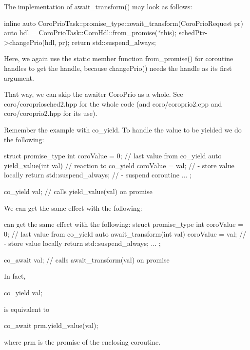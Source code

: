 The implementation of await\_transform() may look as follows:

\begin{cpp}
inline auto CoroPrioTask::promise_type::await_transform(CoroPrioRequest pr) {
	auto hdl = CoroPrioTask::CoroHdl::from_promise(*this);
	schedPtr->changePrio(hdl, pr);
	return std::suspend_always{};
}
\end{cpp}

Here, we again use the static member function from\_promise() for coroutine handles to get the handle, because changePrio() needs the handle as its first argument.

That way, we can skip the awaiter CoroPrio as a whole. See coro/coropriosched2.hpp for the whole code (and coro/coroprio2.cpp and coro/coroprio2.hpp for its use).


Remember the example with co\_yield. To handle the value to be yielded we do the following:

\begin{cpp}
struct promise_type {
	int coroValue = 0; // last value from co_yield
	auto yield_value(int val) { // reaction to co_yield
		coroValue = val; // - store value locally
		return std::suspend_always{}; // - suspend coroutine
	}
	...
};

co_yield val; // calls yield_value(val) on promise
\end{cpp}

We can get the same effect with the following:

\begin{cpp}
 can get the same effect with the following:
struct promise_type {
	int coroValue = 0; // last value from co_yield
	auto await_transform(int val) {
		coroValue = val; // - store value locally
		return std::suspend_always{};
	}
	...
};

co_await val; // calls await_transform(val) on promise
\end{cpp}

In fact,

\begin{cpp}
co_yield val;
\end{cpp}

is equivalent to

\begin{cpp}
co_await prm.yield_value(val);
\end{cpp}

where prm is the promise of the enclosing coroutine.

